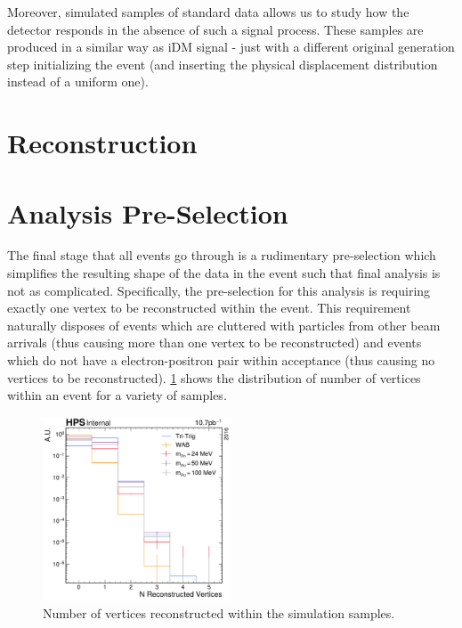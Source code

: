 Moreover, simulated samples of standard data allows us to study how the detector responds in the
absence of such a signal process. These samples are produced in a similar way as iDM signal - just
with a different original generation step initializing the event (and inserting the physical
displacement distribution instead of a uniform one).

\section{Reconstruction}

\section{Analysis Pre-Selection}
The final stage that all events go through is a rudimentary pre-selection which simplifies the
resulting shape of the data in the event such that final analysis is not as complicated.
Specifically, the pre-selection for this analysis is requiring exactly one vertex to be
reconstructed within the event. This requirement naturally disposes of events which are cluttered
with particles from other beam arrivals (thus causing more than one vertex to be reconstructed) and
events which do not have a electron-positron pair within acceptance (thus causing no vertices to be
reconstructed). \cref{fig:n-vertex-pre-selection} shows the distribution of number of vertices
within an event for a variety of samples.

\begin{figure}
  \centering
  \includegraphics[width=0.5\textwidth]{figures/hps/dataset/n-vertex-pre-selection-mc-only.pdf}
  \caption{Number of vertices reconstructed within the simulation samples.}
  \label{fig:n-vertex-pre-selection}
\end{figure}
